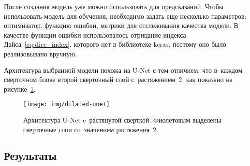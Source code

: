 После создания модель уже можно использовать для предсказаний. Чтобы использовать модель для обучения, необходимо задать еще несколько параметров: оптимизатор, функцию ошибки, метрики для отслеживания качества модели. В качестве функции ошибки использовалось отрицание индекса Дайса~\eqref{eq:dice_index}, которого нет в библиотеке keras, поэтому оно было реализовывано вручную.

Архитектура выбранной модели похожа на U-Net с тем отличием, 
что в~каждом сверточном блоке второй сверточный слой с~растяжением~2,
как показано на рисунке~\ref{fig:dilated-unet}.

\begin{figure}[ht]
  \texttt{[image: img/dilated-unet]}
  \caption{Архитектура U-Net c~растянутой сверткой. Фиолетовым выделены сверточные слои со~значением растяжения~2.}
  \label{fig:dilated-unet}
\end{figure}

\newpage
\subsection{Результаты} 

